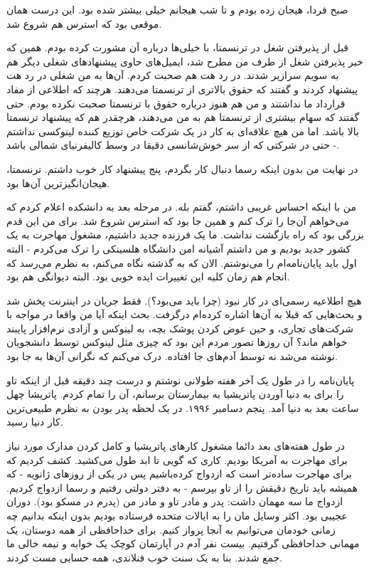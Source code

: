 صبح فردا، هیجان زده بودم و تا شب هیجانم خیلی بیشتر شده بود. این درست
همان موقعی بود که استرس هم شروع شد.

قبل از پذیرفتن شغل در ترنسمتا، با خیلی‌ها درباره آن مشورت کرده
بودم. همین که خبر پذیرفتن شغل از طرف من مطرح شد، ایمیل‌های حاوی
پیشنهادهای شغلی دیگر هم به سویم سرازیر شدند. در رد
هت هم صحبت کردم. آن‌ها به من شغلی در رد هت پیشنهاد
کردند و گفتند که حقوق بالاتری از ترنسمتا می‌دهند. هرچند که اطلاعی از
مفاد قرارداد ما نداشتند و من هم هنوز درباره حقوق با ترنسمتا صحبت نکرده
بودم. حتی گفتند که سهام بیشتری از ترنسمتا هم به من می‌دهند، هرچقدر هم
که پیشنهاد ترنسمتا بالا باشد. اما من هیچ علاقه‌ای به کار در یک شرکت خاص
توزیع کننده لینوکسی نداشتم - حتی در شرکتی که از سر خوش‌شانسی دقیقا در
وسط کالیفرنیای شمالی باشد.

در نهایت من بدون اینکه رسما دنبال کار بگردم، پنج پیشنهاد کار خوب
داشتم. ترنسمتا، هیجان‌انگیزترین آن‌ها بود.

من با اینکه احساس غریبی داشتم، گفتم بله. در مرحله بعد به دانشکده اعلام
کردم که می‌خواهم آن‌جا را ترک کنم و همین جا بود که استرس شروع شد. برای
من این قدم بزرگی بود که راه بازگشت نداشت. ما یک فرزنده جدید داشتیم،
مشغول مهاجرت به یک کشور جدید بودیم و من داشتم آشیانه امن دانشگاه
هلسینکی را ترک می‌کردم - البته اول باید پایان‌نامه‌ام را می‌نوشتم. الان که
به گذشته نگاه می‌کنم، به نظرم می‌رسد که انجام هم زمان کلیه این تغییرات
ایده خوبی بود. البته دیوانگی هم بود.

هیچ اطلاعیه رسمی‌ای در کار نبود (چرا باید می‌بود؟). فقط جریان در اینترنت
پخش شد و بحث‌هایی که قبلا به آن‌ها اشاره کرده‌ام درگرفت. بحث اینکه آیا من
واقعا در مواجه با شرکت‌های تجاری، و حین عوض کردن پوشک بچه‌، به لینوکس و
آزادی نرم‌افزار پایبند خواهم ماند؟ آن روزها تصور مردم این بود که چیزی
مثل لینوکس توسط دانشجویان نوشته می‌شد نه توسط آدم‌های جا افتاده. درک
می‌کنم که نگرانی آن‌ها به جا بود.

پایان‌نامه‌ را در طول یک آخر هفته طولانی نوشتم و درست چند دقیقه قبل از
اینکه تاو را برای به دنیا آوردن پاتریشیا به بیمارستان برسانم، آن را
تمام کردم. پاتریشا چهل ساعت بعد به دنیا آمد. پنجم دسامبر ۱۹۹۶. در یک
لحظه پدر بودن به نظرم طبیعی‌ترین کار دنیا رسید.

در طول هفته‌های بعد دائما مشغول کارهای پاتریشیا و کامل کردن مدارک مورد
نیاز برای مهاجرت به آمریکا بودیم. کاری که گویی تا ابد طول می‌کشید. کشف
کردیم که برای مهاجرت ساده‌تر است که ازدواج کرده‌باشیم پس در یکی از
روزهای ژانویه - که همیشه باید تاریخ دقیقش را از تاو بپرسم - به دفتر
دولتی رفتیم و رسما ازدواج کردیم. ازدواج ما سه مهمان داشت: پدر و مادر
تاو و مادر من (پدرم در مسکو بود). دوران عجیبی بود. اکثر وسایل مان را
به ایالات متحده فرستاده بودیم بدون اینکه بدانیم چه زمانی خودمان
می‌توانیم به آنجا پرواز کنیم. برای خداحافظی از همه دوستان، یک مهمانی
خداحافظی گرفتیم. بیست نفر آدم در آپارتمان کوچک یک خوابه و نیمه خالی ما
جمع شدند. بنا به یک سنت خوب فنلاندی، همه حسابی مست کردند.

